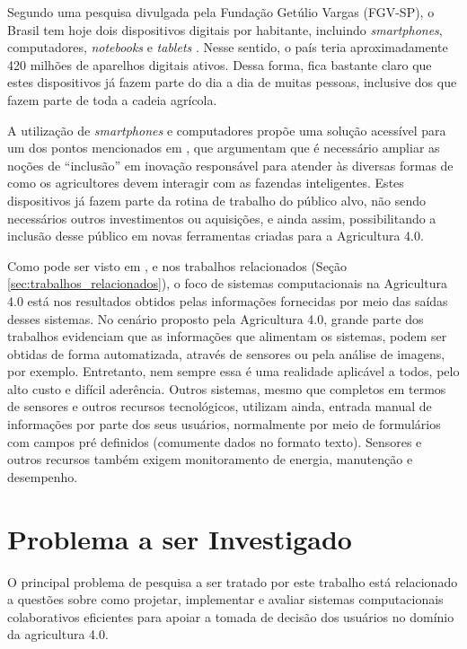 \documentclass[12pt]{article}
\begin{document}
Segundo uma pesquisa divulgada pela Fundação Getúlio Vargas (FGV-SP), o Brasil tem hoje dois dispositivos digitais por habitante, incluindo \textit{smartphones}, computadores, \textit{notebooks} e \textit{tablets} \cite{FGV:2020}. Nesse sentido, o país teria aproximadamente 420 milhões de aparelhos digitais ativos. Dessa forma, fica bastante claro que estes dispositivos já fazem parte do dia a dia de muitas pessoas, inclusive dos que fazem parte de toda a cadeia agrícola.

A utilização de \textit{smartphones} e computadores propõe uma solução acessível para um dos pontos mencionados em , que argumentam que é necessário ampliar as noções de ``inclusão'' em inovação responsável para atender às diversas formas de como os agricultores devem interagir com as fazendas inteligentes. Estes dispositivos já fazem parte da rotina de trabalho do público alvo, não sendo necessários outros investimentos ou aquisições, e ainda assim, possibilitando a inclusão desse público em novas ferramentas criadas para a Agricultura 4.0.

Como pode ser visto em , e nos trabalhos relacionados (Seção \ref{sec:trabalhos_relacionados}), o foco de sistemas computacionais na Agricultura 4.0 está nos resultados obtidos pelas informações fornecidas por meio das saídas desses sistemas. No cenário proposto pela Agricultura 4.0, grande parte dos trabalhos evidenciam que as informações que alimentam os sistemas, podem ser obtidas de forma automatizada, através de sensores ou pela análise de imagens, por exemplo. Entretanto, nem sempre essa é uma realidade aplicável a todos, pelo alto custo e difícil aderência. Outros sistemas, mesmo que completos em termos de sensores e outros recursos tecnológicos, utilizam ainda, entrada manual de informações por parte dos seus usuários, normalmente por meio de formulários com campos pré definidos (comumente dados no formato texto). Sensores e outros recursos também exigem monitoramento de energia, manutenção e desempenho.

\section{Problema a ser Investigado}
\label{subsec:problema_investigado}

O principal problema de pesquisa a ser tratado por este trabalho está relacionado a questões sobre como projetar, implementar e avaliar sistemas computacionais colaborativos eficientes para apoiar a tomada de decisão dos usuários no domínio da agricultura 4.0.
\end{document}
